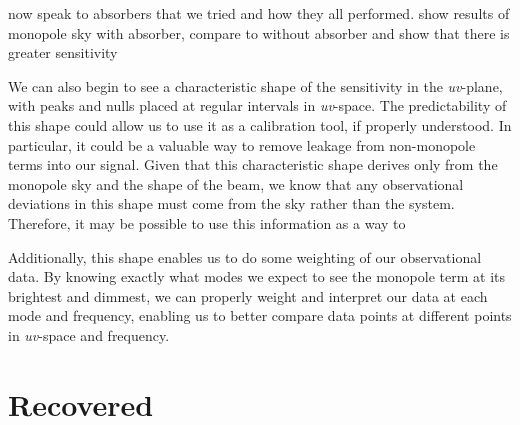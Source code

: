 now speak to absorbers that we tried and how they all performed. show results 
of monopole sky with absorber, compare to without absorber and show that there 
is greater sensitivity

We can also begin to see a characteristic shape of the sensitivity in the 
\emph{uv}-plane, with peaks and nulls placed at regular intervals in 
\emph{uv}-space. The predictability of this shape could allow us to use it as a 
calibration tool, if properly understood. In particular, it could be a valuable 
way to remove leakage from non-monopole terms into our signal. Given that this 
characteristic shape derives only from the monopole sky and the shape of the 
beam, we know that any observational deviations in this shape must come from 
the sky rather than the system. Therefore, it may be possible to use this 
information as a way to 

Additionally, this shape enables us to do some weighting of our observational 
data. By knowing exactly what modes we expect to see the monopole term at its 
brightest and dimmest, we can properly weight and interpret our data at each 
mode and frequency, enabling us to better compare data points at different 
points in \emph{uv}-space and frequency.

\section{Recovered}

